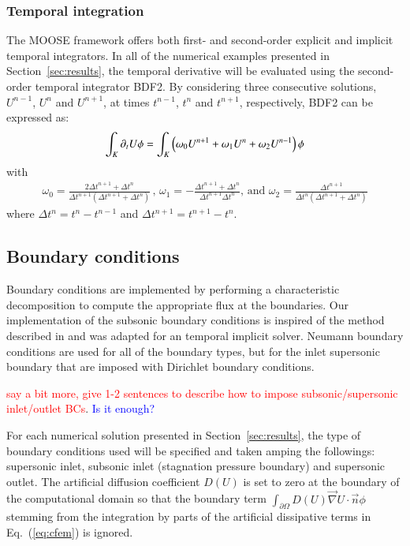 \documentclass[preprint,10pt]{elsarticle}
\newcommand{\grad}{\vec{\nabla}}
\newcommand{\eqt}[1]{Eq.~(\ref{#1})}                     %
\newcommand{\sct}[1]{Section~\ref{#1}}                   %
\newcommand{\tcr}[1]{\textcolor{red}{#1}}
\newcommand{\tcb}[1]{\textcolor{blue}{#1}}
\begin{document}
\subsubsection{Temporal integration} 
The MOOSE framework offers both first- and second-order explicit and implicit temporal integrators. In all of the numerical examples presented in \sct{sec:results}, the temporal derivative  will be evaluated using the second-order temporal integrator BDF2. By considering three consecutive solutions, $U^{n-1}$, $U^n$ and $U^{n+1}$, at times $t^{n-1}$, $t^n$ and $t^{n+1}$, respectively, BDF2 can be expressed as:
\begin{equation}
\label{eq:BDF2}
\int_{K} \partial_t U \phi = \int_{K} \left( \omega_0 U^{n+1}  + \omega_1 U^n + \omega_2 U^{n-1} \right) \phi\\
\end{equation}
%
with
\begin{multline}
\omega_0 =\frac{2\Delta t^{n+1}+\Delta t^n}{\Delta t^{n+1} \left( \Delta t^{n+1}+\Delta t^n \right)} \,,\,
\omega_1 = -\frac{\Delta t^{n+1}+\Delta t^n}{\Delta t^{n+1} \Delta t^n} 
\text{, and } \omega_2 = \frac{\Delta t^{n+1}}{\Delta t^n \left( \Delta t^{n+1} + \Delta t^n \right)} \nonumber
\end{multline}
where $\Delta t^{n} = t^n-t^{n-1}$ and $\Delta t^{n+1} = t^{n+1}-t^{n}$.

\subsection{Boundary conditions} \label{sec:bc}
Boundary conditions are implemented by performing a characteristic decomposition to compute the appropriate flux at the boundaries.
Our implementation of the subsonic boundary conditions is inspired of the method described in \cite{SEM} and was adapted for an temporal implicit solver. Neumann boundary conditions are used for all of the boundary types, but for the inlet supersonic boundary that are imposed with Dirichlet boundary conditions.

\tcr{say a bit more, give 1-2 sentences to describe how to impose subsonic/supersonic inlet/outlet BCs}. \tcb{Is it enough?}

For each numerical solution presented in \sct{sec:results}, the type of boundary conditions used will be specified and taken amping the followings: supersonic inlet, subsonic inlet (stagnation pressure boundary) and supersonic outlet. 
The artificial diffusion coefficient $D(U)$ is set to zero at the boundary of the computational domain so that the boundary term $\int_{\partial \Omega} D(U) \grad U \cdot \vec{n} \phi$ stemming from the integration by parts of the artificial dissipative terms in \eqt{eq:cfem} is ignored.
\end{document}
